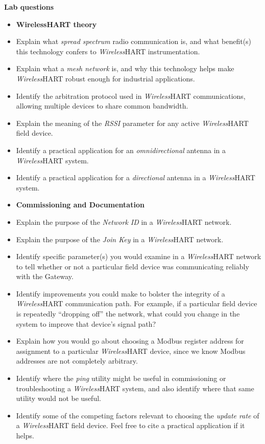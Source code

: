 \begin{itemize}
\vfil \eject

\noindent
{\bf Lab questions}

\vskip 5pt

\begin{itemize}
\item{} {\bf WirelessHART theory}
\item{} Explain what {\it spread spectrum} radio communication is, and what benefit(s) this technology confers to {\sl Wireless}HART instrumentation.
\item{} Explain what a {\it mesh network} is, and why this technology helps make {\sl Wireless}HART robust enough for industrial applications.
\item{} Identify the arbitration protocol used in {\sl Wireless}HART communications, allowing multiple devices to share common bandwidth.
\item{} Explain the meaning of the {\it RSSI} parameter for any active {\sl Wireless}HART field device.
\item{} Identify a practical application for an {\it omnidirectional} antenna in a {\sl Wireless}HART system.
\item{} Identify a practical application for a {\it directional} antenna in a {\sl Wireless}HART system.
\end{itemize}

\filbreak

\begin{itemize}
\item{} {\bf Commissioning and Documentation}
\item{} Explain the purpose of the {\it Network ID} in a {\sl Wireless}HART network.
\item{} Explain the purpose of the {\it Join Key} in a {\sl Wireless}HART network.
\item{} Identify specific parameter(s) you would examine in a {\sl Wireless}HART network to tell whether or not a particular field device was communicating reliably with the Gateway.
\item{} Identify improvements you could make to bolster the integrity of a {\sl Wireless}HART communication path.  For example, if a particular field device is repeatedly ``dropping off'' the network, what could you change in the system to improve that device's signal path?
\item{} Explain how you would go about choosing a Modbus register address for assignment to a particular {\sl Wireless}HART device, since we know Modbus addresses are not completely arbitrary.
\item{} Identify where the {\it ping} utility might be useful in commissioning or troubleshooting a {\sl Wireless}HART system, and also identify where that same utility would not be useful.
\item{} Identify some of the competing factors relevant to choosing the {\it update rate} of a {\sl Wireless}HART field device.  Feel free to cite a practical application if it helps.
\end{itemize}


\end{itemize}
